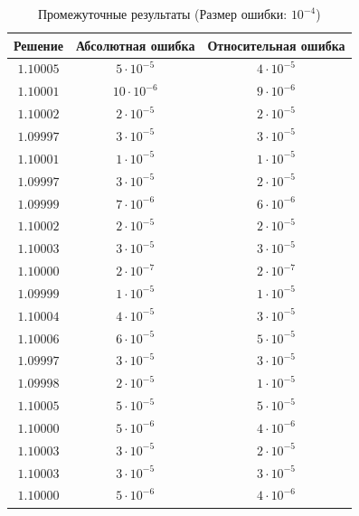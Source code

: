 \begin{table}[h]
   \centering
   \caption{Промежуточные результаты (Размер ошибки: $10^{-4}$)}
   \begin{tabular}{|c|c|c|}
       \hline
       Решение & Абсолютная ошибка & Относительная ошибка \\
       \hline
       $1.10005$ & $5 \cdot 10^{-5}$ & $4 \cdot 10^{-5}$ \\
       \hline
       $1.10001$ & $10 \cdot 10^{-6}$ & $9 \cdot 10^{-6}$ \\
       \hline
       $1.10002$ & $2 \cdot 10^{-5}$ & $2 \cdot 10^{-5}$ \\
       \hline
       $1.09997$ & $3 \cdot 10^{-5}$ & $3 \cdot 10^{-5}$ \\
       \hline
       $1.10001$ & $1 \cdot 10^{-5}$ & $1 \cdot 10^{-5}$ \\
       \hline
       $1.09997$ & $3 \cdot 10^{-5}$ & $2 \cdot 10^{-5}$ \\
       \hline
       $1.09999$ & $7 \cdot 10^{-6}$ & $6 \cdot 10^{-6}$ \\
       \hline
       $1.10002$ & $2 \cdot 10^{-5}$ & $2 \cdot 10^{-5}$ \\
       \hline
       $1.10003$ & $3 \cdot 10^{-5}$ & $3 \cdot 10^{-5}$ \\
       \hline
       $1.10000$ & $2 \cdot 10^{-7}$ & $2 \cdot 10^{-7}$ \\
       \hline
       $1.09999$ & $1 \cdot 10^{-5}$ & $1 \cdot 10^{-5}$ \\
       \hline
       $1.10004$ & $4 \cdot 10^{-5}$ & $3 \cdot 10^{-5}$ \\
       \hline
       $1.10006$ & $6 \cdot 10^{-5}$ & $5 \cdot 10^{-5}$ \\
       \hline
       $1.09997$ & $3 \cdot 10^{-5}$ & $3 \cdot 10^{-5}$ \\
       \hline
       $1.09998$ & $2 \cdot 10^{-5}$ & $1 \cdot 10^{-5}$ \\
       \hline
       $1.10005$ & $5 \cdot 10^{-5}$ & $5 \cdot 10^{-5}$ \\
       \hline
       $1.10000$ & $5 \cdot 10^{-6}$ & $4 \cdot 10^{-6}$ \\
       \hline
       $1.10003$ & $3 \cdot 10^{-5}$ & $2 \cdot 10^{-5}$ \\
       \hline
       $1.10003$ & $3 \cdot 10^{-5}$ & $3 \cdot 10^{-5}$ \\
       \hline
       $1.10000$ & $5 \cdot 10^{-6}$ & $4 \cdot 10^{-6}$ \\

\end{tabular}
\end{table}
